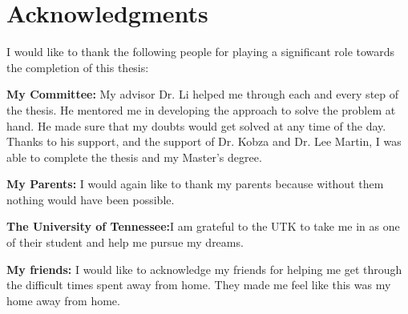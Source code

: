 \chapter*{Acknowledgments}
I would like to thank the following people for playing a significant role towards the completion of this thesis:

\textbf{My Committee:} My advisor Dr. Li helped me through each and every step of the thesis. He mentored me in developing the approach to solve the problem at hand. He made sure that my doubts would get solved at any time of the day. Thanks to his support, and the support of Dr. Kobza and Dr. Lee Martin, I was able to complete the thesis and my Master's degree. 

\textbf{My Parents:} I would again like to thank my parents because without them nothing would have been possible. 

\textbf{The University of Tennessee:}I am grateful to the UTK to take me in as one of their student and help me pursue my dreams.

\textbf{My friends:} I would like to acknowledge my friends for helping me get through the difficult times spent away from home. They made me feel like this was my home away from home.